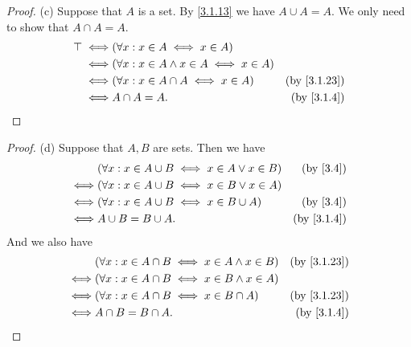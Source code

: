 \begin{proof}{(c)}
  Suppose that \(A\) is a set.
  By \cref{3.1.13} we have \(A \cup A = A\).
  We only need to show that \(A \cap A = A\).
  \begin{align*}
    \top \iff & (\forall x : x \in A \iff x \in A)                                           \\
    \iff      & (\forall x : x \in A \land x \in A \iff x \in A)                             \\
    \iff      & (\forall x : x \in A \cap A \iff x \in A)        & \text{(by \cref{3.1.23})} \\
    \iff      & A \cap A = A.                                    & \text{(by \cref{3.1.4})}
  \end{align*}
\end{proof}

\begin{proof}{(d)}
  Suppose that \(A, B\) are sets.
  Then we have
  \begin{align*}
         & (\forall x : x \in A \cup B \iff x \in A \lor x \in B) & \text{(by \cref{3.4})}   \\
    \iff & (\forall x : x \in A \cup B \iff x \in B \lor x \in A)                            \\
    \iff & (\forall x : x \in A \cup B \iff x \in B \cup A)       & \text{(by \cref{3.4})}   \\
    \iff & A \cup B = B \cup A.                                   & \text{(by \cref{3.1.4})}
  \end{align*}
  And we also have
  \begin{align*}
         & (\forall x : x \in A \cap B \iff x \in A \land x \in B) & \text{(by \cref{3.1.23})} \\
    \iff & (\forall x : x \in A \cap B \iff x \in B \land x \in A)                             \\
    \iff & (\forall x : x \in A \cap B \iff x \in B \cap A)        & \text{(by \cref{3.1.23})} \\
    \iff & A \cap B = B \cap A.                                    & \text{(by \cref{3.1.4})}
  \end{align*}
\end{proof}

